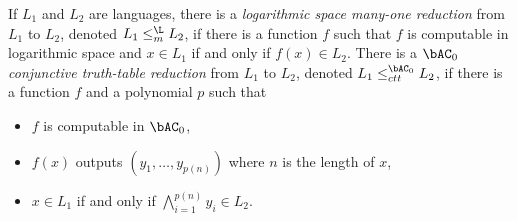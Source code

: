 \documentclass{article}
\begin{document}
If $L_1$ and $L_2$ are languages, there is a \emph{logarithmic space many-one reduction} from $L_1$ to $L_2$, denoted $L_1 \leq_m^{\L} L_2$, if there is a function $f$ such that $f$ is computable in logarithmic space and $x \in L_1$ if and only if $f(x) \in L_2$.
There is a \emph{$\bAC_0$ conjunctive truth-table reduction} from $L_1$ to $L_2$, denoted $L_1 \leq^{\bAC_0}_{ctt} L_2$, if there is a function $f$ and a polynomial $p$ such that
\begin{itemize}
\item $f$ is computable in $\bAC_0$,
\item $f(x)$ outputs $(y_1, \dotsc, y_{p(n)})$ where $n$ is the length of $x$,
\item $x \in L_1$ if and only if $\bigwedge_{i = 1}^{p(n)} y_i \in L_2$.
\end{itemize}
\end{document}
